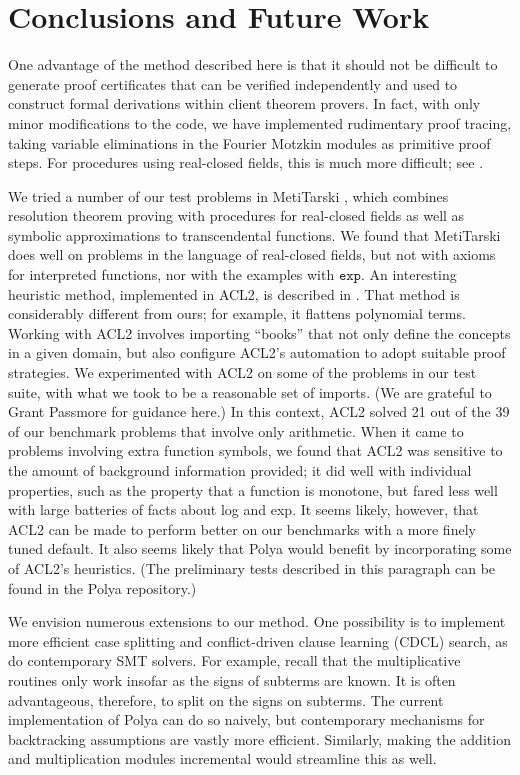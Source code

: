 \documentclass[runningheds]{llncs}
\newcommand{\fn}[1]{\mathtt{#1}} \newcommand{\nroot}{\fn{root}}
\begin{document}
\section{Conclusions and Future Work}
\label{section:conclusions}

One advantage of the method described here is that it should not be difficult to generate proof certificates that can be verified independently and used to construct formal derivations within client theorem provers. In fact, with only minor modifications to the code, we have implemented rudimentary proof tracing, taking variable eliminations in the Fourier Motzkin modules as primitive proof steps. For procedures using real-closed fields, this is much more difficult; see \cite{mclaughlin:harrison:05} \cite{harrison:07b}.

We tried a number of our test problems in MetiTarski \cite{akbarpour:paulson:08}, which combines resolution theorem proving with procedures for real-closed fields as well as symbolic approximations to transcendental functions. We found that MetiTarski does well on problems in the language of real-closed fields, but not with axioms for interpreted functions, nor with the examples with $\fn{exp}$. An interesting heuristic method, implemented in ACL2, is described in \cite{hunt:et:al:03}. That method is considerably different from ours; for example, it flattens polynomial terms. Working with ACL2 involves importing ``books'' that not only define the concepts in a given domain, but also configure ACL2's automation to adopt suitable proof strategies. We experimented with ACL2 on some of the problems in our test suite, with what we took to be a reasonable set of imports. (We are grateful to Grant Passmore for guidance here.) In this context, ACL2 solved 21 out of the 39 of our benchmark problems that involve only arithmetic. When it came to problems involving extra function symbols, we found that ACL2 was sensitive to the amount of background information provided; it did well with individual properties, such as the property that a function is monotone, but fared less well with large batteries of facts about log and exp. It seems likely, however, that ACL2 can be made to perform better on our benchmarks with a more finely tuned default. It also seems likely that Polya would benefit by incorporating some of ACL2's heuristics. (The preliminary tests described in this paragraph can be found in the Polya repository.)

We envision numerous extensions to our method. One possibility is to implement more efficient case splitting and conflict-driven clause learning (CDCL) search, as do contemporary SMT solvers. For example, recall that the multiplicative routines only work insofar as the signs of subterms are known. It is often advantageous, therefore, to split on the signs on subterms. The current implementation of Polya can do so naively, but contemporary mechanisms for backtracking assumptions are vastly more efficient. Similarly, making the addition and multiplication modules incremental would streamline this as well.
\end{document}
